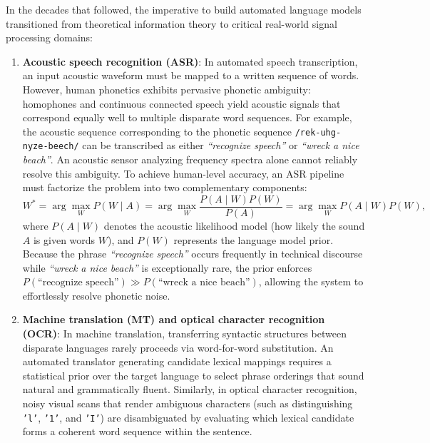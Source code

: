 \documentclass[../../main.tex]{subfiles}
\begin{document}
In the decades that followed, the imperative to build automated language models transitioned from theoretical information theory to critical real-world signal processing domains:
\begin{enumerate}
    \item \textbf{Acoustic speech recognition (ASR)}: In automated speech transcription, an input acoustic waveform must be mapped to a written sequence of words. However, human phonetics exhibits pervasive phonetic ambiguity: homophones and continuous connected speech yield acoustic signals that correspond equally well to multiple disparate word sequences. For example, the acoustic sequence corresponding to the phonetic sequence \texttt{/rek-uhg-nyze-beech/} can be transcribed as either \textit{``recognize speech''} or \textit{``wreck a nice beach''}. An acoustic sensor analyzing frequency spectra alone cannot reliably resolve this ambiguity. To achieve human-level accuracy, an ASR pipeline must factorize the problem into two complementary components:
    \begin{equation}
    W^* = \arg\max_W P(W \mid A) = \arg\max_W \frac{P(A \mid W) P(W)}{P(A)} = \arg\max_W P(A \mid W) P(W),
    \label{eq:noisy_channel_asr}
    \end{equation}
    where $P(A \mid W)$ denotes the acoustic likelihood model (how likely the sound $A$ is given words $W$), and $P(W)$ represents the language model prior. Because the phrase \textit{``recognize speech''} occurs frequently in technical discourse while \textit{``wreck a nice beach''} is exceptionally rare, the prior enforces $P(\text{``recognize speech''}) \gg P(\text{``wreck a nice beach''})$, allowing the system to effortlessly resolve phonetic noise.
    
    \item \textbf{Machine translation (MT) and optical character recognition (OCR)}: In machine translation, transferring syntactic structures between disparate languages rarely proceeds via word-for-word substitution. An automated translator generating candidate lexical mappings requires a statistical prior over the target language to select phrase orderings that sound natural and grammatically fluent. Similarly, in optical character recognition, noisy visual scans that render ambiguous characters (such as distinguishing \texttt{'l'}, \texttt{'1'}, and \texttt{'I'}) are disambiguated by evaluating which lexical candidate forms a coherent word sequence within the sentence.
\end{enumerate}
\end{document}

